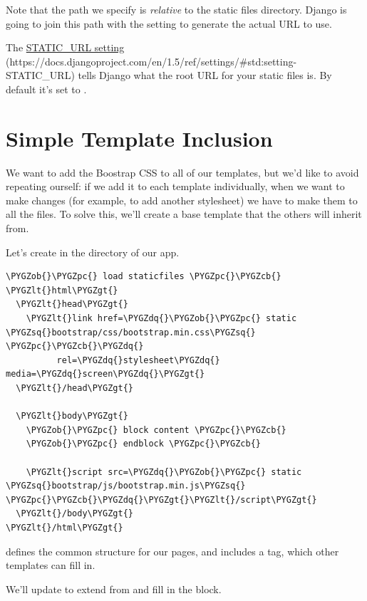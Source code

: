 \documentclass[letterpaper,10pt,english]{sphinxmanual}
\def\PYGZob{\char`\{}
\def\PYGZcb{\char`\}}
\def\PYGZlt{\char`\<}
\def\PYGZgt{\char`\>}
\def\PYGZpc{\char`\%}
\def\PYGZsq{\char`\'}
\def\PYGZdq{\char`\"}
\renewcommand\PYGZsq{\textquotesingle}
\begin{document}
Note that the path we specify is \emph{relative} to the static files
directory. Django is going to join this path with the 
setting to generate the actual URL to use.

The \href{https://docs.djangoproject.com/en/1.5/ref/settings/\#std:setting-STATIC\_URL}{STATIC\_URL setting} (https://docs.djangoproject.com/en/1.5/ref/settings/\#std:setting-STATIC\_URL) tells Django what the root URL for your
static files is. By default it's set to .


\section{Simple Template Inclusion}
\label{tutorial/static:static-url-setting}\label{tutorial/static:simple-template-inclusion}
We want to add the Boostrap CSS to all of our templates, but we'd like
to avoid repeating ourself: if we add it to each template
individually, when we want to make changes (for example, to add
another stylesheet) we have to make them to all the files. To solve
this, we'll create a base template that the others will inherit from.

Let's create  in the  directory of our
 app.

\begin{Verbatim}[commandchars=\\\{\}]
\PYGZob{}\PYGZpc{} load staticfiles \PYGZpc{}\PYGZcb{}
\PYGZlt{}html\PYGZgt{}
  \PYGZlt{}head\PYGZgt{}
    \PYGZlt{}link href=\PYGZdq{}\PYGZob{}\PYGZpc{} static \PYGZsq{}bootstrap/css/bootstrap.min.css\PYGZsq{} \PYGZpc{}\PYGZcb{}\PYGZdq{}
          rel=\PYGZdq{}stylesheet\PYGZdq{} media=\PYGZdq{}screen\PYGZdq{}\PYGZgt{}
  \PYGZlt{}/head\PYGZgt{}

  \PYGZlt{}body\PYGZgt{}
    \PYGZob{}\PYGZpc{} block content \PYGZpc{}\PYGZcb{}
    \PYGZob{}\PYGZpc{} endblock \PYGZpc{}\PYGZcb{}

    \PYGZlt{}script src=\PYGZdq{}\PYGZob{}\PYGZpc{} static \PYGZsq{}bootstrap/js/bootstrap.min.js\PYGZsq{} \PYGZpc{}\PYGZcb{}\PYGZdq{}\PYGZgt{}\PYGZlt{}/script\PYGZgt{}
  \PYGZlt{}/body\PYGZgt{}
\PYGZlt{}/html\PYGZgt{}
\end{Verbatim}

 defines the common structure for our pages, and includes
a  tag, which other templates can fill in.

We'll update  to extend from  and
fill in the  block.
\end{document}
